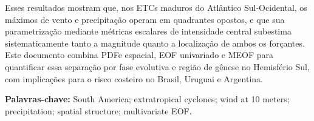 Esses resultados mostram que, nos ETCs maduros do Atlântico Sul-Ocidental, os máximos de vento e precipitação operam em quadrantes opostos, e que sua parametrização mediante métricas escalares de intensidade central subestima sistematicamente tanto a magnitude quanto a localização de ambos os forçantes.
Este documento combina PDFe espacial, EOF univariado e MEOF para quantificar essa separação por fase evolutiva e região de gênese no Hemisfério Sul, com implicações para o risco costeiro no Brasil, Uruguai e Argentina.

\vspace{1cm}

\noindent \textbf{Palavras-chave:} South America; extratropical cyclones; wind at 10 meters; precipitation; spatial structure; multivariate EOF.
